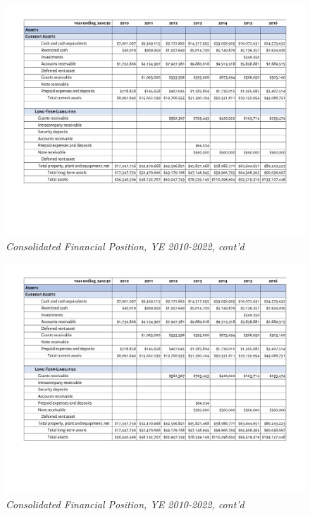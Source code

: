 \begin{figure}
  \caption*{\textit{Consolidated Financial Position, YE 2010-2022, cont'd}}
  \includegraphics[page=3,scale=0.8]{Consolidated_Financial_Position_2010-2022} %
\end{figure}

\begin{figure}
  \caption*{\textit{Consolidated Financial Position, YE 2010-2022, cont'd}}
  \includegraphics[page=4,scale=0.8]{Consolidated_Financial_Position_2010-2022} %
\end{figure}

